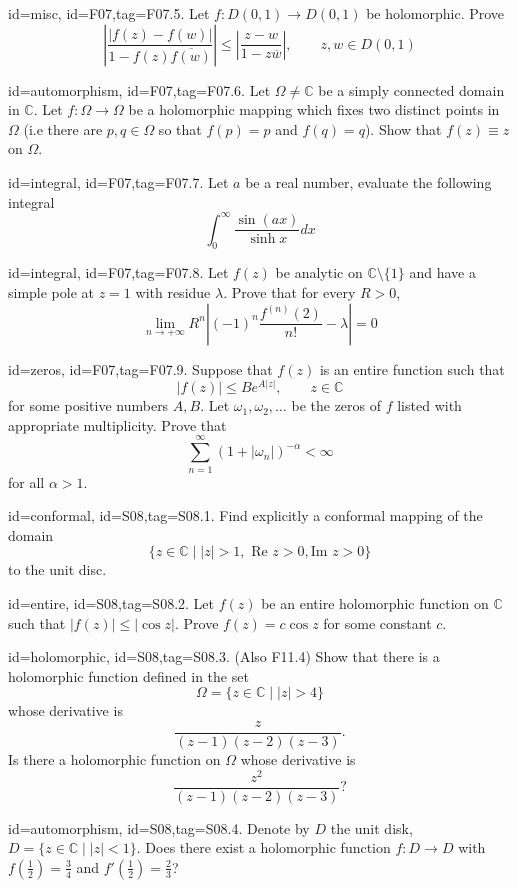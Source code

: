 \documentclass[12pt,letterpaper]{article}
\begin{document}
{\item[id=misc, id=F07,tag=F07.5.]
Let $f : D(0,1) \rightarrow D(0,1)$ be holomorphic. Prove
\[
	\left| \frac{| f(z) - f(w) |}{1 - f(z)\overline{f(w)}} \right| \le \left| \frac{z-w}{1-z\overline{w}} \right|, \qquad z, w \in D(0,1)
\]

\item[id=automorphism, id=F07,tag=F07.6.]
Let $\Omega \ne \mathbb{C}$ be a simply connected domain in $\mathbb{C}$. Let $f : \Omega \rightarrow \Omega$ be a holomorphic mapping which fixes two distinct points in $\Omega$ (i.e there are $p,q \in \Omega$ so that $f(p) = p$ and $f(q) = q$). Show that $f(z) \equiv z$ on $\Omega$.

\item[id=integral, id=F07,tag=F07.7.]
Let $a$ be a real number, evaluate the following integral
\[
	\int_{0}^{\infty} \frac{\sin(ax)}{\sinh x} dx
\]

\item[id=integral, id=F07,tag=F07.8.]
Let $f(z)$ be analytic on $\mathbb{C} \setminus \{1\}$ and have a simple pole at $z = 1$ with residue $\lambda$. Prove that for every $R > 0$,
\[
	\lim_{n\rightarrow+\infty} R^n \left| (-1)^n\frac{f^{(n)}(2)}{n!} - \lambda \right| = 0
\]

\item[id=zeros, id=F07,tag=F07.9.]
Suppose that $f(z)$ is an entire function such that
\[
	| f(z) | \le B e^{A| z |}, \qquad z \in \mathbb{C}
\]
for some positive numbers $A, B$. Let $\omega_1, \omega_2,\ldots$ be the zeros of $f$ listed with appropriate multiplicity. Prove that
\[
	\sum_{n=1}^{\infty}(1+ | \omega_n |)^{-\alpha} < \infty
\]
for all $\alpha > 1$.


\item[id=conformal, id=S08,tag=S08.1.]
Find explicitly a conformal mapping of the domain
\[
	\{z \in \mathbb{C} \mid | z | > 1, \text{ Re }z > 0, \text{Im } z > 0 \}
\]
to the unit disc.

\item[id=entire, id=S08,tag=S08.2.]
Let $f(z)$ be an entire holomorphic function on $\mathbb{C}$ such that $| f(z) | \le | \cos z |$. Prove $f(z) = c \cos z$ for some constant $c$.

\item[id=holomorphic, id=S08,tag=S08.3.]
(Also F11.4) Show that there is a holomorphic function defined in the set
\[
	\Omega = \{z \in \mathbb{C} \mid | z | > 4\}
\]
whose derivative is
\[
	\frac{z}{(z-1)(z-2)(z-3)}.
\]
Is there a holomorphic function on $\Omega$ whose derivative is
\[
	\frac{z^2}{(z-1)(z-2)(z-3)}?
\]
\item[id=automorphism, id=S08,tag=S08.4.]
Denote by $D$ the unit disk, $D = \{z \in \mathbb{C} \mid | z | < 1\}$. Does there exist a holomorphic function $f : D \rightarrow D$ with $f(\frac{1}{2}) = \frac{3}{4}$ and $f'(\frac{1}{2}) = \frac{2}{3}$?


}
\end{document}
